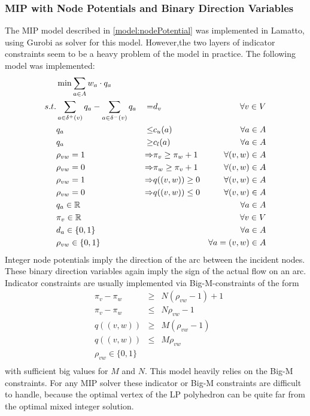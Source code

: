 \subsubsection{MIP with Node Potentials and Binary Direction Variables}
The MIP model described in \ref{model:nodePotential} was implemented in Lamatto, using Gurobi as solver for this 
model. However,the two layers of indicator constraints seem to be a heavy problem of the model in 
practice. The following model was implemented:
\begin{align*}
  &\min \sum_{a\in A} w_a\cdot q_a & \\
 s.t. & \sum_{a\in \delta^+(v)}q_a - \sum_{a\in\delta^- (v)}q_a &=& d_v\ &\forall v\in V \\
 & q_a &\le& c_u(a) & \forall a\in A\\
 & q_a &\ge& c_l(a) & \forall a\in A\\
 & \rho_{vw}=1 &\Rightarrow &\pi_v\ge\pi_w +1 & \forall (v,w)\in A\\
 & \rho_{vw}=0 &\Rightarrow &\pi_w\ge\pi_v +1& \forall (v,w)\in A\\
 & \rho_{vw}=1 &\Rightarrow &q((v,w))\ge 0& \forall (v,w)\in A\\
 & \rho_{vw}=0 &\Rightarrow &q((v,w))\le 0& \forall (v,w)\in A\\
 & q_a \in \mathbb{R} & & &\forall a\in A\\
 & \pi_v \in \mathbb{R} & & & \forall v\in V\\
 & d_a \in \{0,1\} & & &\forall a\in A\\
 & \rho_{vw} \in \{0,1\}&&& \forall a=(v,w)\in A\\
\end{align*}
Integer node potentials imply the direction of the arc between the incident nodes. These binary direction 
variables again imply the sign of the actual flow on an arc. Indicator constraints are usually implemented via 
Big-M-constraints of the form 
\begin{align*}
 &\pi_v-\pi_w &\ge & N(\rho_{vw}-1)+1\\
 &\pi_v-\pi_w&\le &N\rho_{vw}-1 \\
 &q((v,w))&\ge& M(\rho_{vw}-1)\\
 &q((v,w))&\le & M\rho_{vw}\\
 &\rho_{vw} \in \{0,1\}&&\\
\end{align*}
with sufficient big values for $M$ and $N$. This model heavily relies on the Big-M constraints.
For any MIP solver these indicator or Big-M constraints are difficult to handle, because the optimal vertex of the LP 
polyhedron can be quite far from the optimal mixed integer solution.\\

